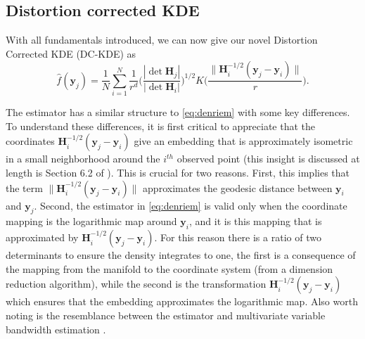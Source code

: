 \documentclass[11pt,a4paper,]{article}
\begin{document}
\hypertarget{DCKDE}{%
\subsection{Distortion corrected KDE}\label{DCKDE}}

With all fundamentals introduced, we can now give our novel Distortion Corrected KDE (DC-KDE) as
\begin{equation}
\label{eq:denestimator}
\hat{f}(\pmb{y}_j) = \frac{1}{N} \sum_{i=1}^{N} \frac{1}{r^d} \bigg(\frac{|\det \pmb{H}_j|}{|\det \pmb{H}_i|} \bigg)^{1/2} K\bigg( \frac{\| \pmb{H}^{-1/2}_i (\pmb{y}_j - \pmb{y}_i)\|}{r} \bigg).
\end{equation}

The estimator has a similar structure to \autoref{eq:denriem} with some key differences. To understand these differences, it is first critical to appreciate that the coordinates \(\pmb{H}^{-1/2}_i (\pmb{y}_j - \pmb{y}_i)\) give an embedding that is approximately isometric in a small neighborhood around the \(i^{th}\) observed point (this insight is discussed at length is Section 6.2 of \textcite{Perrault-Joncas2013-pq}). This is crucial for two reasons. First, this implies that the term \(\| \pmb{H}^{-1/2}_i (\pmb{y}_j - \pmb{y}_i)\|\) approximates the geodesic distance between \(\pmb{y}_i\) and \(\pmb{y}_j\). Second, the estimator in \autoref{eq:denriem} is valid only when the coordinate mapping is the logarithmic map around \(\pmb{y}_i\), and it is this mapping that is approximated by \(\pmb{H}^{-1/2}_i (\pmb{y}_j - \pmb{y}_i)\). For this reason there is a ratio of two determinants to ensure the density integrates to one, the first is a consequence of the mapping from the manifold to the coordinate system (from a dimension reduction algorithm), while the second is the transformation \(\pmb{H}^{-1/2}_i (\pmb{y}_j - \pmb{y}_i)\) which ensures that the embedding approximates the logarithmic map. Also worth noting is the resemblance between the estimator and multivariate variable bandwidth estimation \autocite{Breiman1977-qc,Jones1990-oe,Terrell1992-ut}.
\end{document}
